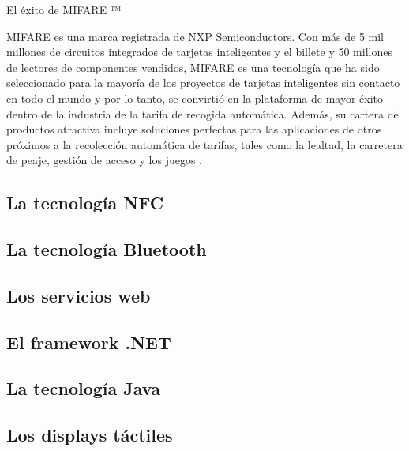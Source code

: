 El éxito de MIFARE ™

MIFARE es una marca registrada de NXP Semiconductors. Con más de 5 mil millones de circuitos integrados de tarjetas inteligentes y el billete y 50 millones de lectores de componentes vendidos, MIFARE es una tecnología que ha sido seleccionado para la mayoría de los proyectos de tarjetas inteligentes sin contacto en todo el mundo y por lo tanto, se convirtió en la plataforma de mayor éxito dentro de la industria de la tarifa de recogida automática. Además, su cartera de productos atractiva incluye soluciones perfectas para las aplicaciones de otros próximos a la recolección automática de tarifas, tales como la lealtad, la carretera de peaje, gestión de acceso y los juegos
\cite{bib:urlMifare}.



  \subsection{La tecnología NFC}
  \subsection{La tecnología Bluetooth}
  \subsection{Los servicios web}
  \subsection{El framework .NET}
  \subsection{La tecnología Java}
  \subsection{Los displays táctiles}
